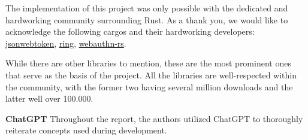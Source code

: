 The implementation of this project was only possible with the dedicated and
hardworking community surrounding Rust.
As a thank you, we would like to acknowledge the following cargos and their
hardworking developers:
\href{https://crates.io/crates/jsonwebtoken}{jsonwebtoken},
\href{https://crates.io/crates/ring}{ring},
\href{https://crates.io/crates/webauthn-rs}{webauthn-rs}.

While there are other libraries to mention, these are the most prominent ones
that serve as the basis of the project.
All the libraries are well-respected within the community, with the former two
having several million downloads and the latter well over 100.000.

\textbf{ChatGPT}
Throughout the report, the authors utilized ChatGPT to thoroughly reiterate
concepts used during development.
